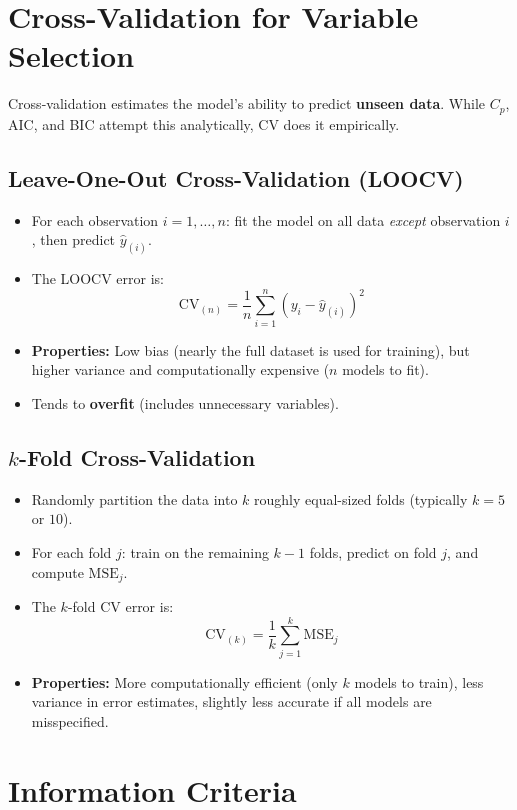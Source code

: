 \documentclass{article}
\begin{document}
\newpage
\section{Cross-Validation for Variable Selection}

Cross-validation estimates the model's ability to predict \textbf{unseen data}. While $C_p$, AIC, and BIC attempt this analytically, CV does it empirically.

\subsection{Leave-One-Out Cross-Validation (LOOCV)}
\begin{itemize}
    \item For each observation $i = 1, \dots, n$: fit the model on all data \textit{except} observation $i$, then predict $\hat{y}_{(i)}$.
    \item The LOOCV error is:
    $$\text{CV}_{(n)} = \frac{1}{n} \sum_{i=1}^{n} (y_i - \hat{y}_{(i)})^2$$
    \item \textbf{Properties:} Low bias (nearly the full dataset is used for training), but higher variance and computationally expensive ($n$ models to fit).
    \item Tends to \textbf{overfit} (includes unnecessary variables).
\end{itemize}

\subsection{$k$-Fold Cross-Validation}
\begin{itemize}
    \item Randomly partition the data into $k$ roughly equal-sized folds (typically $k = 5$ or $10$).
    \item For each fold $j$: train on the remaining $k-1$ folds, predict on fold $j$, and compute $\text{MSE}_j$.
    \item The $k$-fold CV error is:
    $$\text{CV}_{(k)} = \frac{1}{k} \sum_{j=1}^{k} \text{MSE}_j$$
    \item \textbf{Properties:} More computationally efficient (only $k$ models to train), less variance in error estimates, slightly less accurate if all models are misspecified.
\end{itemize}

\section{Information Criteria}
\end{document}
